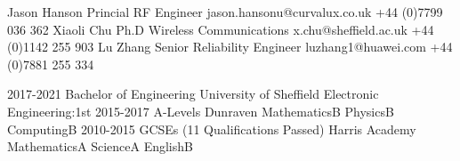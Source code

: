 \documentclass[9pt]{developercv} %
\begin{document}
\begin{minipage}[t]{0.40\textwidth}%

	\halfentry
		{Jason Hanson}
		{Princial RF Engineer}
		{
			\hspace*{0.5cm}jason.hansonu@curvalux.co.uk\newline
			\hspace*{0.5cm}+44 (0)7799 036 362\newline
		}
	\halfentry
		{Xiaoli Chu}
		{Ph.D Wireless Communications}
		{
			\hspace*{0.5cm}x.chu@sheffield.ac.uk\newline
			\hspace*{0.5cm}+44 (0)1142 255 903\newline\newline
		}
	\halfentry
		{Lu Zhang}
		{Senior Reliability Engineer}
		{	
			\hspace*{0.5cm}luzhang1@huawei.com\newline
			\hspace*{0.5cm}+44 (0)7881 255 334\newline
		}

	
\end{minipage}
\hspace*{0.5cm}
\begin{minipage}[t]{0.57\textwidth}
	\cvsect{Education}

	\halfentrydate
		{2017-2021}
		{Bachelor of Engineering}
		{University of Sheffield}
		{
			\hspace*{0.5cm}Electronic Engineering:\hfill1st\newline\newline
		}
	\halfentrydate
		{2015-2017}
		{A-Levels}
		{Dunraven}
		{
			\hspace*{0.5cm}Mathematics\hfill B\newline
			\hspace*{0.5cm}Physics\hfill B\newline
			\hspace*{0.5cm}Computing\hfill B\newline
		}
	\halfentrydate
		{2010-2015}
		{GCSEs (11 Qualifications Passed)}
		{Harris Academy}
		{
			\hspace*{0.5cm}Mathematics\hfill A\newline
			\hspace*{0.5cm}Science\hfill A\newline
			\hspace*{0.5cm}English\hfill B\newline
		}
\end{minipage}%
\end{document}
